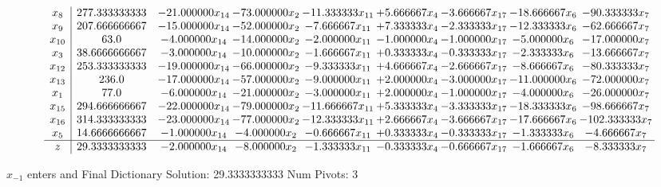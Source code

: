 \documentclass[10pt]{article}
\begin{document}
 \[\begin{array}{c| c c@{\hskip 2pt} c@{\hskip 2pt} c@{\hskip 2pt} c@{\hskip 2pt} c@{\hskip 2pt} c@{\hskip 2pt} c@{\hskip 2pt} }
 x_{8}   &  277.333333333 & -21.000000 x_{14} & -73.000000 x_{2} & -11.333333 x_{11} & + 5.666667 x_{4} & -3.666667 x_{17} & -18.666667 x_{6} & -90.333333 x_{7}\\
 x_{9}   &  207.666666667 & -15.000000 x_{14} & -52.000000 x_{2} & -7.666667 x_{11} & + 7.333333 x_{4} & -2.333333 x_{17} & -12.333333 x_{6} & -62.666667 x_{7}\\
 x_{10}   &  63.0 & -4.000000 x_{14} & -14.000000 x_{2} & -2.000000 x_{11} & -1.000000 x_{4} & -1.000000 x_{17} & -5.000000 x_{6} & -17.000000 x_{7}\\
 x_{3}   &  38.6666666667 & -3.000000 x_{14} & -10.000000 x_{2} & -1.666667 x_{11} & + 0.333333 x_{4} & -0.333333 x_{17} & -2.333333 x_{6} & -13.666667 x_{7}\\
 x_{12}   &  253.333333333 & -19.000000 x_{14} & -66.000000 x_{2} & -9.333333 x_{11} & + 4.666667 x_{4} & -2.666667 x_{17} & -8.666667 x_{6} & -80.333333 x_{7}\\
 x_{13}   &  236.0 & -17.000000 x_{14} & -57.000000 x_{2} & -9.000000 x_{11} & + 2.000000 x_{4} & -3.000000 x_{17} & -11.000000 x_{6} & -72.000000 x_{7}\\
 x_{1}   &  77.0 & -6.000000 x_{14} & -21.000000 x_{2} & -3.000000 x_{11} & + 2.000000 x_{4} & -1.000000 x_{17} & -4.000000 x_{6} & -26.000000 x_{7}\\
 x_{15}   &  294.666666667 & -22.000000 x_{14} & -79.000000 x_{2} & -11.666667 x_{11} & + 5.333333 x_{4} & -3.333333 x_{17} & -18.333333 x_{6} & -98.666667 x_{7}\\
 x_{16}   &  314.333333333 & -23.000000 x_{14} & -77.000000 x_{2} & -12.333333 x_{11} & + 2.666667 x_{4} & -3.666667 x_{17} & -17.666667 x_{6} & -102.333333 x_{7}\\
 x_{5}   &  14.6666666667 & -1.000000 x_{14} & -4.000000 x_{2} & -0.666667 x_{11} & + 0.333333 x_{4} & -0.333333 x_{17} & -1.333333 x_{6} & -4.666667 x_{7}\\
\hline
z    &  29.3333333333 & -2.000000 x_{14} & -8.000000 x_{2} & -1.333333 x_{11} & -0.333333 x_{4} & -0.666667 x_{17} & -1.666667 x_{6} & -8.333333 x_{7}\\
\end{array}\]


 $ x_{-1} $ enters and Final Dictionary
Solution:  29.3333333333
Num Pivots:  3
\end{document}
